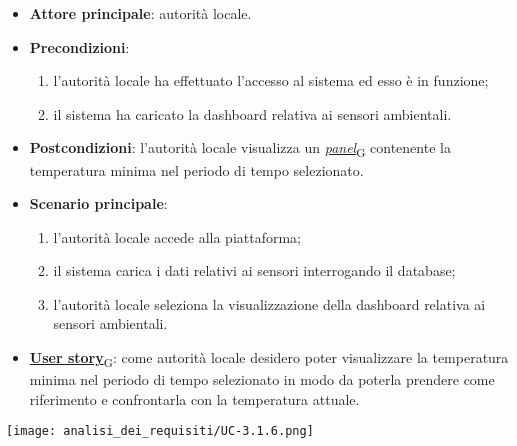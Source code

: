 \begin{itemize}
	\item \textbf{Attore principale}: autorità locale.
	\item \textbf{Precondizioni}:
	      \begin{enumerate}
		      \item l'autorità locale ha effettuato l'accesso al sistema ed esso è in funzione;
		      \item il sistema ha caricato la dashboard relativa ai sensori ambientali.
	      \end{enumerate}
	\item \textbf{Postcondizioni}: l'autorità locale visualizza un \href{https://7last.github.io/docs/pb/documentazione-interna/glossario\#panel}{\textit{panel}\textsubscript{G}} contenente la temperatura minima nel periodo di tempo selezionato.
	\item \textbf{Scenario principale}:
	      \begin{enumerate}
		      \item l'autorità locale accede alla piattaforma;
		      \item il sistema carica i dati relativi ai sensori interrogando il database;
		      \item l'autorità locale seleziona la visualizzazione della dashboard relativa ai sensori ambientali.
	      \end{enumerate}
	\item \href{https://7last.github.io/docs/pb/documentazione-interna/glossario\#user-story}{\textbf{User story}\textsubscript{G}}:
	      come autorità locale desidero poter visualizzare la temperatura minima nel periodo di tempo selezionato
	      in modo da poterla prendere come riferimento e confrontarla con la temperatura attuale.
\end{itemize}
\begin{center}
	\texttt{[image: analisi\_dei\_requisiti/UC-3.1.6.png]}
\end{center}


